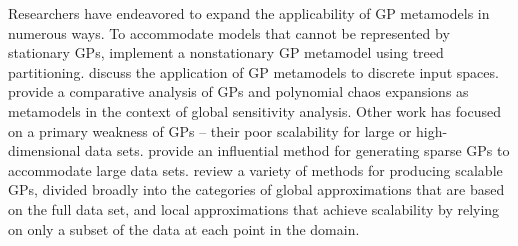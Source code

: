 \documentclass[10pt,a4paper]{article}
\begin{document}
Researchers have endeavored to expand the applicability of GP metamodels in numerous ways.
To accommodate models that cannot be represented by stationary GPs, \cite{Gramacy2008} implement a nonstationary GP metamodel using treed partitioning.
\citet{Qian2008} discuss the application of GP metamodels to discrete input spaces.
\citet{Gratiet2016} provide a comparative analysis of GPs and polynomial chaos expansions as metamodels in the context of global sensitivity analysis.
Other work has focused on a primary weakness of GPs -- their poor scalability for large or high-dimensional data sets.
\citet{Snelson2006} provide an influential method for generating sparse GPs to accommodate large data sets.
\citet{Liu2020} review a variety of methods for producing scalable GPs, divided broadly into the categories of global approximations that are based on the full data set, and local approximations that achieve scalability by relying on only a subset of the data at each point in the domain.






	
\end{document}
